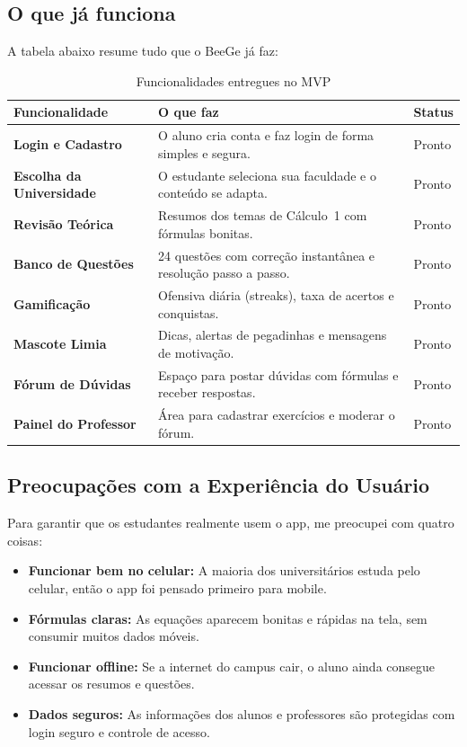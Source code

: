 \documentclass[12pt, a4paper]{article}
\begin{document}
\subsection{O que j\'{a} funciona}

A tabela abaixo resume tudo que o BeeGe j\'{a} faz:

\begin{table}[H]
\centering
\caption{Funcionalidades entregues no MVP}
\label{tab:funcionalidades}
\begin{tabularx}{\textwidth}{l X l}
\toprule
\textbf{Funcionalidade} & \textbf{O que faz} & \textbf{Status} \\
\midrule
\textbf{Login e Cadastro} & O aluno cria conta e faz login de forma simples e segura. & Pronto \\
\textbf{Escolha da Universidade} & O estudante seleciona sua faculdade e o conte\'{u}do se adapta. & Pronto \\
\textbf{Revis\~{a}o Te\'{o}rica} & Resumos dos temas de C\'{a}lculo~1 com f\'{o}rmulas bonitas. & Pronto \\
\textbf{Banco de Quest\~{o}es} & 24 quest\~{o}es com corre\c{c}\~{a}o instant\^{a}nea e resolu\c{c}\~{a}o passo a passo. & Pronto \\
\textbf{Gamifica\c{c}\~{a}o} & Ofensiva di\'{a}ria (streaks), taxa de acertos e conquistas. & Pronto \\
\textbf{Mascote Limia} & Dicas, alertas de pegadinhas e mensagens de motiva\c{c}\~{a}o. & Pronto \\
\textbf{F\'{o}rum de D\'{u}vidas} & Espa\c{c}o para postar d\'{u}vidas com f\'{o}rmulas e receber respostas. & Pronto \\
\textbf{Painel do Professor} & \'{A}rea para cadastrar exerc\'{i}cios e moderar o f\'{o}rum. & Pronto \\
\bottomrule
\end{tabularx}
\end{table}

\subsection{Preocupa\c{c}\~{o}es com a Experi\^{e}ncia do Usu\'{a}rio}

Para garantir que os estudantes realmente usem o app, me preocupei com quatro coisas:

\begin{itemize}[leftmargin=2cm]
  \item \textbf{Funcionar bem no celular:} A maioria dos universit\'{a}rios estuda pelo celular, ent\~{a}o o app foi pensado primeiro para mobile.
  \item \textbf{F\'{o}rmulas claras:} As equa\c{c}\~{o}es aparecem bonitas e r\'{a}pidas na tela, sem consumir muitos dados m\'{o}veis.
  \item \textbf{Funcionar offline:} Se a internet do campus cair, o aluno ainda consegue acessar os resumos e quest\~{o}es.
  \item \textbf{Dados seguros:} As informa\c{c}\~{o}es dos alunos e professores s\~{a}o protegidas com login seguro e controle de acesso.
\end{itemize}
\end{document}
